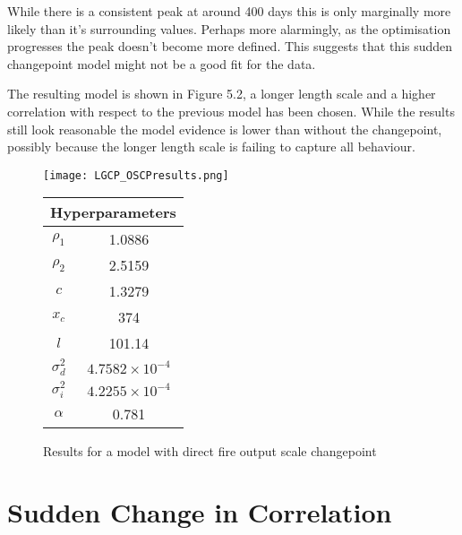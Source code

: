 \documentclass[a4paper,11pt]{report}
\begin{document}
While there is a consistent peak at around 400 days this is only marginally more likely than it's surrounding values. Perhaps more alarmingly, as the optimisation progresses the peak doesn't become more defined. This suggests that this sudden changepoint model might not be a good fit for the data.

The resulting model is shown in Figure 5.2, a longer length scale and a higher correlation with respect to the previous model has been chosen. While the results still look reasonable the model evidence is lower than without the changepoint, possibly because the longer length scale is failing to capture all behaviour. 

  \begin{figure}[!ht]
    \centering
    \texttt{[image: LGCP\_OSCPresults.png]}
    \qquad
    \doublespacing
    \begin{tabular}[b]{cc}
    \multicolumn{2}{c}{\textbf{Hyperparameters}}                                            \\ \hline
      \(\rho_1\)                    & 1.0886                \\                       
\(\rho_2\)                     & 2.5159                           \\            
\(c\)                               & 1.3279                                      \\ 
\(x_c\)                        & 374                                         \\ 
\(l\)                               & 101.14                                      \\  
\(\sigma_d^2\) & \(4.7582 \times 10^{-4}\) \\ 
\(\sigma_i^2\) & \(4.2255 \times 10^{-4}\) \\ 
\(\alpha\)                      & 0.781              \\                      
    \end{tabular}
    \captionsetup{labelformat=andtable}
    \caption{Results for a model with direct fire output scale changepoint}
  \end{figure}


\section{Sudden Change in Correlation}
\end{document}
